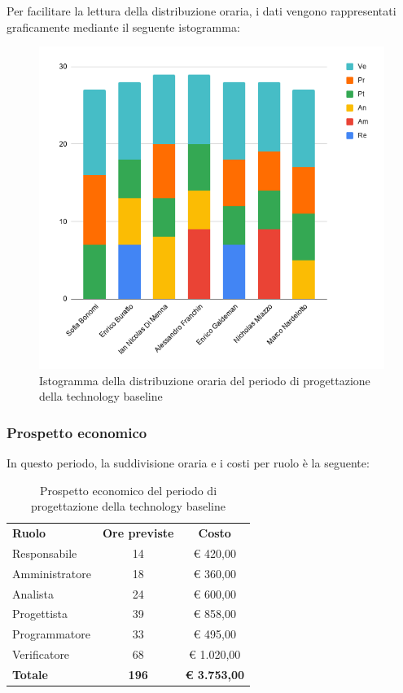 \documentclass[../piano-di-progetto.tex]{subfiles}
\begin{document}
  Per facilitare la lettura della distribuzione oraria, i dati vengono rappresentati graficamente mediante il seguente istogramma:
  \begin{figure}[H]
    \centering
    \includegraphics[width=12cm]{img/ore-progettazione.png}
    \caption{Istogramma della distribuzione oraria del periodo di progettazione della technology baseline}
    \label{fig:ore-componente-progettazione}
  \end{figure}

  \subsubsection{Prospetto economico}
  In questo periodo, la suddivisione oraria e i costi per ruolo è la seguente:

  \begin{table}[H]
    \centering
    \begin{tabular}{lcc}
      \rowcolor{lightgray}
      \textbf{Ruolo}  & \textbf{Ore previste} & \textbf{Costo}  \\
      Responsabile    & 14           & € 420,00            \\
      Amministratore  & 18           & € 360,00            \\
      Analista        & 24           & € 600,00            \\
      Progettista     & 39           & € 858,00            \\
      Programmatore   & 33           & € 495,00            \\
      Verificatore    & 68           & € 1.020,00          \\
      \textbf{Totale} & \textbf{196} & \textbf{€ 3.753,00}
    \end{tabular}
    \caption{Prospetto economico del periodo di progettazione della technology baseline}
  \end{table}
\end{document}
